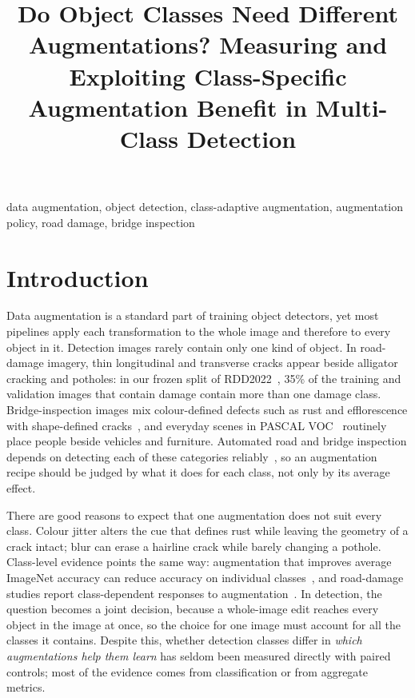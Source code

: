 \documentclass[conference]{IEEEtran}
\begin{document}
\title{Do Object Classes Need Different Augmentations? Measuring and Exploiting Class-Specific Augmentation Benefit in Multi-Class Detection}
\maketitle



\begin{IEEEkeywords}
data augmentation, object detection, class-adaptive augmentation, augmentation policy, road damage, bridge inspection
\end{IEEEkeywords}

\section{Introduction}
\label{sec:intro}

Data augmentation is a standard part of training object detectors, yet most pipelines apply each transformation to the whole image and therefore to every object in it. Detection images rarely contain only one kind of object. In road-damage imagery, thin longitudinal and transverse cracks appear beside alligator cracking and potholes: in our frozen split of RDD2022~\cite{arya2024rdd}, 35\% of the training and validation images that contain damage contain more than one damage class. Bridge-inspection images mix colour-defined defects such as rust and efflorescence with shape-defined cracks~\cite{flotzinger2024dacl10k}, and everyday scenes in PASCAL VOC~\cite{everingham2010voc} routinely place people beside vehicles and furniture. Automated road and bridge inspection depends on detecting each of these categories reliably~\cite{shang2024automated,zheng2024deep,vision2025inspection}, so an augmentation recipe should be judged by what it does for each class, not only by its average effect.

There are good reasons to expect that one augmentation does not suit every class. Colour jitter alters the cue that defines rust while leaving the geometry of a crack intact; blur can erase a hairline crack while barely changing a pothole. Class-level evidence points the same way: augmentation that improves average ImageNet accuracy can reduce accuracy on individual classes~\cite{kirichenko2023}, and road-damage studies report class-dependent responses to augmentation~\cite{tsuchiya2019}. In detection, the question becomes a joint decision, because a whole-image edit reaches every object in the image at once, so the choice for one image must account for all the classes it contains. Despite this, whether detection classes differ in \emph{which augmentations help them learn} has seldom been measured directly with paired controls; most of the evidence comes from classification or from aggregate metrics.
\end{document}
